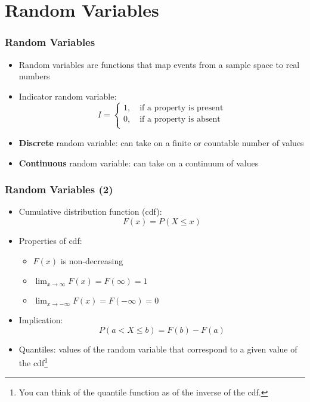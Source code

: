 \documentclass[10pt]{beamer}
\theoremstyle{definition}
\begin{document}
\section{Random Variables}
\begin{frame}[fragile]
\frametitle{Random Variables}
\begin{itemize}
	\item Random variables are functions that map events from a sample space to real numbers
		
	\item Indicator random variable:
	\[
		I = 
		\left\{
			\begin{array}{lcl}
				1, \quad \textrm{if a property is present}\\
				0, \quad \textrm{if a property is absent}\\
			\end{array}
		\right.
	\]
		
	\item \textbf{Discrete} random variable: can take on a finite or countable number of values
		
	\item \textbf{Continuous} random variable: can take on a continuum of values
\end{itemize}
\end{frame}

\begin{frame}[fragile]
\frametitle{Random Variables (2)}
\begin{itemize}
	\item Cumulative distribution function (cdf):
	\[
		F(x) = P(X \leq x)
	\]
	
	\item Properties of cdf:
	\begin{itemize}
		\item $ F(x) $ is non-decreasing
			
		\item $ \lim_{x\to\infty} F(x) = F(\infty) = 1$
			
		\item $ \lim_{x\to - \infty} F(x) = F(-\infty) = 0$
	\end{itemize}
	
	\item Implication:
	\[
		P(a < X \leq b) = F(b) - F(a)
	\]
		
	\item Quantiles: values of the random variable that correspond to a given value of the cdf\footnote{You can think of the quantile function as of the inverse of the cdf.}
\end{itemize}
\end{frame}
\end{document}
